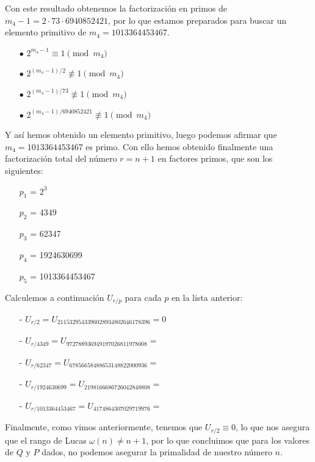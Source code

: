 \documentclass[fleqn]{article}
\begin{document}
    Con este resultado obtenemos la factorización en primos de $m_{4} - 1 = 2 \cdot 73 \cdot 6940852421$, por lo que estamos preparados para buscar un elemento primitivo de $m_{4} = 1013364453467$.
    \begin{enumerate}
        \item[$\bullet$] $2^{m_{4} -1} \equiv 1 \pmod{m_{4}}$
        \item[$\bullet$] $2^{(m_{4} -1)/2} \not\equiv 1 \pmod{m_{4}}$
        \item[$\bullet$] $2^{(m_{4} -1)/73} \not\equiv 1 \pmod{m_{4}}$
        \item[$\bullet$] $2^{(m_{4} -1)/6940852421} \not\equiv 1 \pmod{m_{4}}$
    \end{enumerate}
    Y así hemos obtenido un elemento primitivo, luego podemos afirmar que $m_{4} = 1013364453467$ es primo.
    Con ello hemos obtenido finalmente una factorización total del número $r = n+1$ en factores primos, que son los siguientes:
    \begin{enumerate}
        \item[$p_1$ =] $2^3$
        \item[$p_2$ =] 4349
        \item[$p_3$ =] 62347
        \item[$p_4$ =] 1924630699 
        \item[$p_5$ =] 1013364453467 
    \end{enumerate}
    Calculemos a continuación $U_{r/p}$ para cada $p$ en la lista anterior:
    \begin{enumerate}
        \item[-] $U_{r/2} = U_ {2115329543396028934802646178396} = 0$ %
        \item[-] $U_{r/4349} = U_ {972788936949197026811978008} = $
        \item[-] $U_{r/62347} = U_ {67856658488653148822000936} = $
        \item[-] $U_{r/1924630699} = U_ {2198166686726042848808} = $
        \item[-] $U_{r/1013364453467} = U_ {4174864307029719976} = $
    \end{enumerate}

    Finalmente, como vimos anteriormente, tenemos que $U_{r/2} \equiv 0$, lo que nos asegura que el rango de Lucas $\omega(n) \neq n+1$, por lo
    que concluimos que para los valores de $Q$ y $P$ dados, no podemos asegurar la primalidad de nuestro número $n$.
\end{document}
